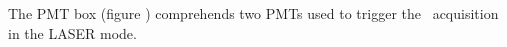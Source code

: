 The PMT box (figure ) comprehends two PMTs used to trigger the \laserii~acquisition in the LASER mode. 